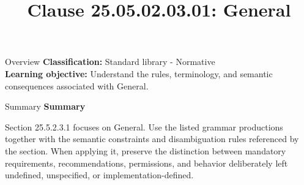 \documentclass[10pt,letterpaper]{article}
\title{Clause 25.05.02.03.01: General}
\author{}
\date{}
\begin{document}
\maketitle
\begin{CornellOverviewBox}{Overview}
\textbf{Classification:} Standard library - Normative\\[2pt]
\textbf{Learning objective:} Understand the rules, terminology, and semantic consequences associated with General.
\end{CornellOverviewBox}\begin{CornellSummaryBox}{Summary}
{\sffamily\bfseries\color{Accent} Summary}\par\vspace{3pt}Section 25.5.2.3.1 focuses on General. Use the listed grammar productions together with the semantic constraints and disambiguation rules referenced by the section. When applying it, preserve the distinction between mandatory requirements, recommendations, permissions, and behavior deliberately left undefined, unspecified, or implementation-defined.
\end{CornellSummaryBox}
\end{document}
